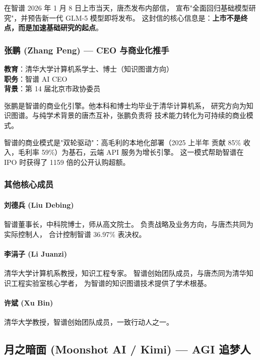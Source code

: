 在智谱 2026 年 1 月 8 日上市当天，唐杰发布内部信，
宣布"全面回归基础模型研究"，并预告新一代 GLM-5 模型即将发布。
这封信的核心信息是：\textbf{上市不是终点，而是加速基础研究的起点}。

\subsubsection{张鹏 (Zhang Peng) — CEO 与商业化推手}

\begin{keybox}[人物档案：张鹏]
\textbf{教育}：清华大学计算机系学士、博士（知识图谱方向） \\
\textbf{职务}：智谱 AI CEO \\
\textbf{背景}：第 14 届北京市政协委员
\end{keybox}

张鹏是智谱的商业化引擎。他本科和博士均毕业于清华计算机系，
研究方向为知识图谱。与纯学术背景的唐杰互补，张鹏负责将
技术能力转化为可持续的商业模式。

智谱的商业模式是"双轮驱动"：高毛利的本地化部署（2025 上半年
贡献 85\% 收入，毛利率 59\%）为基石，云端 API 服务为增长引擎。
这一模式帮助智谱在 IPO 时获得了 1159 倍的公开认购超额。

\subsubsection{其他核心成员}

\paragraph{刘德兵 (Liu Debing)}
智谱董事长，中科院博士，师从高文院士。
负责战略及业务方向，与唐杰共同为实际控制人，
合计控制智谱 36.97\% 表决权。

\paragraph{李涓子 (Li Juanzi)}
清华大学计算机系教授，知识工程专家。
智谱创始团队成员，与唐杰同为清华知识工程实验室核心学者，
为智谱的知识图谱技术提供了学术根基。

\paragraph{许斌 (Xu Bin)}
清华大学教授，智谱创始团队成员，一致行动人之一。


\subsection{月之暗面 (Moonshot AI / Kimi) — AGI 追梦人}

